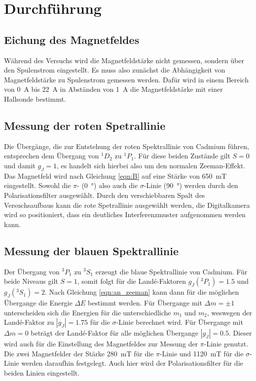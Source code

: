 \section{Durchführung}
\subsection{Eichung des Magnetfeldes}
Während des Versuchs wird die Magnetfeldstärke nicht gemessen, sondern über den Spulenstrom eingestellt.
Es muss also zunächst die Abhängigkeit von Magnetfeldstärke zu Spulenstrom gemessen werden.
Dafür wird in einem Bereich von \SI{0}{\ampere} bis \SI{22}{\ampere} in Abständen von \SI{1}{\ampere} die Magnetfeldstärke mit einer Hallsonde bestimmt.

\subsection{Messung der roten Spetrallinie}

Die Übergänge, die zur Entstehung der roten Spektrallinie von Cadmium führen, entsprechen dem Übergang von $^1D_2$ zu $^1P_1$.
Für diese beiden Zustände gilt $S=0$ und damit $g_J = 1$, es handelt sich hierbei also um den normalen Zeeman-Effekt.
Das Magnetfeld wird nach Gleichung \eqref{eqn:B} auf eine Stärke von \SI{650}{\milli\tesla} eingestellt.
Sowohl die $\pi$- (\SI{0}{\degree}) also auch die $\sigma$-Linie (\SI{90}{\degree}) werden durch den Polarisationsfilter ausgewählt.
Durch den verschiebbaren Spalt des Versuchsaufbaus kann die rote Spetrallinie ausgewählt werden, die Digitalkamera wird so positioniert, dass ein deutliches Interferenzmuster aufgenommen werden kann.


\subsection{Messung der blauen Spektrallinie}
Der Übergang von $^3P_1$ zu $^3S_1$ erzeugt die blaue Spektrallinie von Cadmium.
Für beide Niveaus gilt $S=1$, somit folgt für die Landé-Faktoren $g_J(^3P_1) = \num{1.5}$ und $g_J(^3S_1) = \num{2}$.
Nach Gleichung \ref{eqn:an_zeeman} kann dann für die möglichen Übergange die Energie $\Delta E$ bestimmt werden.
Für Übergange mit $\Delta m = \pm 1$ unterscheiden sich die Energien für die unterschiedliche $m_1$ und $m_2$, weswegen der Landé-Faktor zu $|g_J| = \num{1.75}$
für die $\sigma$-Linie berechnet wird.
Für Übergange mit $\Delta m = 0$ beträgt der Landé-Faktor für alle möglichen Übergange $|g_J| = \num{0.5}$.
Dieser wird auch für die Einstellung des Magnetfeldes zur Messung der $\pi$-Linie genutzt.
Die zwei Magnetfelder der Stärke \SI{280}{\milli\tesla} für die $\pi$-Linie und \SI{1120}{\milli\tesla} für die $\sigma$-Linie werden daraufhin festgelegt.
Auch hier wird der Polarisationsfilter für die beiden Linien eingestellt.
